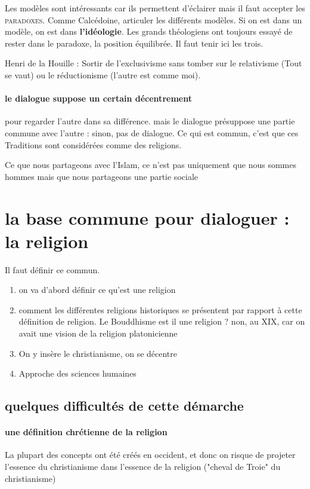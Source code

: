 Les modèles sont intéressants car ils permettent d'éclairer mais il faut accepter les \textsc{paradoxes}. Comme Calcédoine, articuler les différents modèles. Si on est dans un modèle, on est dans \textbf{l'idéologie}. Les grands théologiens ont toujours essayé de rester dans le paradoxe, la position équilibrée. Il faut tenir ici les trois.

Henri de la Houille : Sortir de l'exclusivisme sans tomber sur le relativisme (Tout se vaut) ou le réductionisme (l'autre est comme moi).

\paragraph{le dialogue suppose un certain décentrement} pour regarder l'autre dans sa différence. mais le dialogue présuppose une partie commune avec l'autre : sinon, pas de dialogue. Ce qui est commun, c'est que ces Traditions sont considérées comme des religions.

\begin{Ex}
Ce que nous partageons avec l'Islam, ce n'est pas uniquement que nous sommes hommes mais que nous partageons une partie sociale
\end{Ex}


\section{la base commune pour dialoguer : la religion}

Il faut définir ce commun.

\begin{enumerate}
    \item on va d'abord définir ce qu'est une religion
    \item comment les différentes religions historiques se présentent par rapport à cette définition de religion. Le Bouddhisme est il une religion ? non, au XIX, car on avait une vision de la religion platonicienne
    \item On y insère le christianisme, on se décentre
    \item Approche des sciences humaines
\end{enumerate}

\subsection{quelques difficultés de cette démarche}

\paragraph{une définition chrétienne de la religion} La plupart des concepts ont été créés en occident, et donc on risque de projeter l'essence du christianisme dans l'essence de la religion ("cheval de Troie" du christianisme) 

